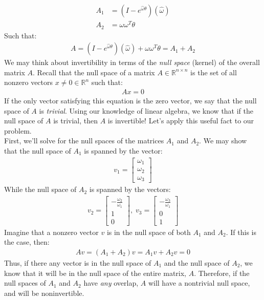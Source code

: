 \documentclass[oneside]{book}
\begin{document}
\begin{align}
    A_1 &= (I - e^{\hat\omega\theta})( \hat\omega)\\
    A_2 &= \omega\omega^T\theta
\end{align}
Such that:
\begin{align}
    A = (I - e^{\hat\omega\theta})( \hat\omega) + \omega\omega^T\theta = A_1+A_2
\end{align}
We may think about invertibility in terms of the \textit{null space} (kernel) of the overall matrix $A$. Recall that the null space of a matrix $A \in \mathbb{R}^{n\times n}$ is the set of all nonzero vectors $x \neq 0\in \mathbb{R}^n$ such that:
\begin{align}
    Ax = 0
\end{align}
If the only vector satisfying this equation is the zero vector, we say that the null space of $A$ is \textit{trivial}. Using our knowledge of linear algebra, we know that if the null space of $A$ is trivial, then $A$ is invertible! Let's apply this useful fact to our problem.\\
First, we'll solve for the null spaces of the matrices $A_1$ and $A_2$. We may show that the null space of $A_1$ is spanned by the vector:
\begin{align}
    v_1 = 
    \begin{bmatrix}
    \omega_1\\
    \omega_2\\
    \omega_3
    \end{bmatrix}
\end{align}
While the null space of $A_2$ is spanned by the vectors:
\begin{align}
    v_2 = 
    \begin{bmatrix}
    -\frac{\omega_2}{\omega_1}\\
    1\\
    0
    \end{bmatrix}, \;
    v_3 =
    \begin{bmatrix}
    -\frac{\omega_3}{\omega_1}\\
    0\\
    1
    \end{bmatrix}
\end{align}
Imagine that a nonzero vector $v$ is in the null space of both $A_1$ and $A_2$. If this is the case, then:
\begin{align}
    Av = (A_1 + A_2)v = A_1v + A_2v = 0
\end{align}
Thus, if there any vector is in the null space of $A_1$ and the null space of $A_2$, we know that it will be in the null space of the entire matrix, $A$. Therefore, if the null spaces of $A_1$ and $A_2$ have \textit{any} overlap, $A$ will have a nontrivial null space, and will be noninvertible.\\
\end{document}

